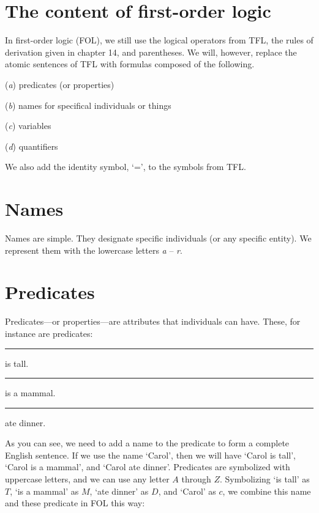 \section{The content of first-order logic}

In first-order logic (FOL), we still use the logical operators from TFL, the rules of derivation given in chapter 14, and parentheses. We will, however, replace the atomic sentences of TFL with formulas composed of the following.

\begin{ebullet}
	\item[(\textit{a})] predicates (or properties)
	\item[(\textit{b})] names for specifical individuals or things 
	\item[(\textit{c})] variables 
	\item[(\textit{d})] quantifiers
\end{ebullet}
We also add the identity symbol, ‘=’, to the symbols from TFL.  


\section{Names}

Names are simple. They designate specific individuals (or any specific entity). We represent them with the lowercase letters \textit{a} -- \textit{r}.

\section{Predicates}

Predicates---or properties---are attributes that individuals can have. These, for instance are predicates:

\begin{ebullet}
	\item[] \rule{1cm}{0.15mm} is tall.
	\item[] \rule{1cm}{0.15mm} is a mammal.
	\item[] \rule{1cm}{0.15mm} ate dinner.
\end{ebullet}

As you can see, we need to add a name to the predicate to form a complete English sentence. If we use the name `Carol’, then we will have ‘Carol is tall’, ‘Carol is a mammal’, and ‘Carol ate dinner’.
Predicates are symbolized with uppercase letters, and we can use any letter $A$ through $Z$. Symbolizing `is tall' as $T$, `is a mammal' as $M$, `ate dinner' as $D$, and `Carol' as $c$, we combine this name and these predicate in FOL this way:

